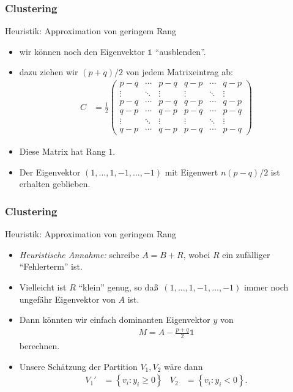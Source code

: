 \documentclass{beamer}
\renewcommand{\emph}[1]{{\textcolor{solarizedRed}{\itshape #1}}}
\newcommand\cbc[1]{\left\{{#1}\right\}}
\newcommand{\vecone}{\mathbb{1}}
\renewcommand{\ae}{\"a}
\renewcommand{\oe}{\"o}
\newcommand{\mytitle}{Clustering}
\begin{document}
\begin{frame}\frametitle{\mytitle}
	\begin{block}{Heuristik: Approximation von geringem Rang}
		\begin{itemize}
			\item wir k\oe nnen noch den Eigenvektor $\vecone$ ``ausblenden''.
			\item dazu ziehen wir $(p+q)/2$ von jedem Matrixeintrag ab:
				\begin{align*}
					C&=\frac{1}{2}	
\begin{pmatrix}
						p-q&\cdots&p-q&q-p&\cdots&q-p\\
						\vdots&\ddots&\vdots&\vdots&\ddots&\vdots\\
						p-q&\cdots&p-q&q-p&\cdots&q-p\\
						q-p&\cdots&q-p&p-q&\cdots&p-q\\
						\vdots&\ddots&\vdots&\vdots&\ddots&\vdots\\
						q-p&\cdots&q-p&p-q&\cdots&p-q
					\end{pmatrix}
				\end{align*}
			\item Diese Matrix hat Rang $1$.
			\item Der Eigenvektor $(1,\ldots,1,-1,\ldots,-1)$ mit Eigenwert $n(p-q)/2$ ist erhalten geblieben.
		\end{itemize}
	\end{block}
\end{frame}

\begin{frame}\frametitle{\mytitle}
	\begin{block}{Heuristik: Approximation von geringem Rang}
		\begin{itemize}
			\item \emph{Heuristische Annahme:} schreibe $A=B+R$, wobei $R$ ein zuf\ae lliger ``Fehlerterm'' ist.
			\item Vielleicht ist $R$ ``klein'' genug, so da\ss\ $(1,\ldots,1,-1,\ldots,-1)$ immer noch ungef\ae hr Eigenvektor von $A$ ist.
			\item Dann k\oe nnten wir einfach dominanten Eigenvektor $y$ von
				\begin{align*}
					M=A-\frac{p+q}{2}\vecone
				\end{align*}
				berechnen.
			\item Unsere Sch\ae tzung der Partition $V_1,V_2$ w\ae re dann
				\begin{align*}
					V_1'&=\cbc{v_i:y_i\geq0}&V_2&=\cbc{v_i:y_i<0}.
				\end{align*}
		\end{itemize}
	\end{block}
\end{frame}
\end{document}
